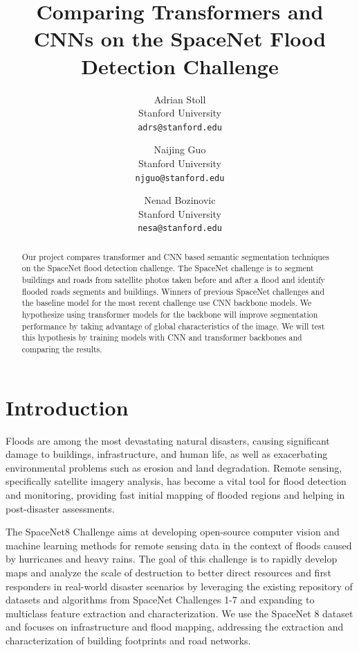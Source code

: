 \documentclass[10pt,twocolumn,letterpaper]{article}
\begin{document}
\title{Comparing Transformers and CNNs on the SpaceNet Flood Detection Challenge}

\author{Adrian Stoll\\
Stanford University\\
{\tt\small adrs@stanford.edu}
\and
Naijing Guo\\
Stanford University\\
{\tt\small njguo@stanford.edu}
\and
Nenad Bozinovic\\
Stanford University\\
{\tt\small nesa@stanford.edu}
}
\maketitle


\begin{abstract}
    Our project compares transformer and CNN based semantic segmentation techniques on the SpaceNet flood detection challenge. The SpaceNet challenge is to segment buildings and roads from satellite photos taken before and after a flood and identify flooded roads segments and buildings. Winners of previous SpaceNet challenges and the baseline model for the most recent challenge use CNN backbone models. We hypothesize using transformer models for the backbone will improve segmentation performance by taking advantage of global characteristics of the image. We will test this hypothesis by training models with CNN and transformer backbones and comparing the results.
\end{abstract}

\section{Introduction}
\label{sec:intro}

Floods are among the most devastating natural disasters, causing significant damage to buildings, infrastructure, and human life, as well as exacerbating environmental problems such as erosion and land degradation. Remote sensing, specifically satellite imagery analysis, has become a vital tool for flood detection and monitoring, providing fast initial mapping of flooded regions and helping in post-disaster assessments. 

The SpaceNet8 Challenge \cite{spacenet8} aims at developing open-source computer vision and machine learning methods for remote sensing data in the context of floods caused by hurricanes and heavy rains. The goal of this challenge is to rapidly develop maps and analyze the scale of destruction to better direct resources and first responders in real-world disaster scenarios by leveraging the existing repository of datasets and algorithms from SpaceNet Challenges 1-7 and expanding to multiclass feature extraction and characterization. We use the SpaceNet 8 dataset and focuses on infrastructure and flood mapping, addressing the extraction and characterization of building footprints and road networks. 
\end{document}
